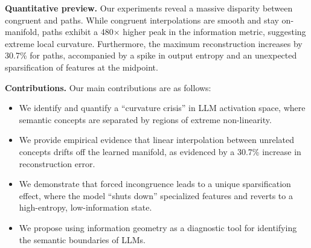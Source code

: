 {\bf Quantitative preview.} Our experiments reveal a massive disparity between congruent and \incongruent paths. While congruent interpolations are smooth and stay on-manifold, \incongruent paths exhibit a 480$\times$ higher peak in the information metric, suggesting extreme local curvature. Furthermore, the maximum \sae reconstruction \mse increases by 30.7\% for \incongruent paths, accompanied by a spike in output entropy and an unexpected sparsification of features at the midpoint.

{\bf Contributions.} Our main contributions are as follows:
\begin{itemize}[leftmargin=*,itemsep=0pt,topsep=0pt]
    \item We identify and quantify a ``curvature crisis'' in LLM activation space, where \incongruent semantic concepts are separated by regions of extreme non-linearity.
    \item We provide empirical evidence that linear interpolation between unrelated concepts drifts off the learned manifold, as evidenced by a 30.7\% increase in \sae reconstruction error.
    \item We demonstrate that forced incongruence leads to a unique sparsification effect, where the model ``shuts down'' specialized features and reverts to a high-entropy, low-information state.
    \item We propose using information geometry as a diagnostic tool for identifying the semantic boundaries of LLMs.
\end{itemize}
